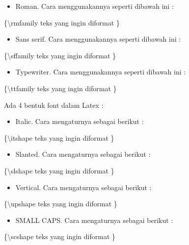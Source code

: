 \begin{itemize}
\item Roman. Cara menggunakannya seperti dibawah ini :
\end{itemize}
\hspace{0,5in}\{$\setminus$rmfamily teks yang ingin diformat \}

\begin{itemize}
\item Sans serif. Cara menggunakannya seperti dibawah ini :
\end{itemize}
\hspace{0,5in}\{$\setminus$sffamily teks yang ingin diformat \}

\begin{itemize}
\item Typewriter. Cara menggunakannya seperti dibawah ini :
\end{itemize}
\hspace{0,5in}\{$\setminus$ttfamily teks yang ingin diformat \}\par \vspace{12pt}



Ada 4 bentuk font dalam Latex :

\begin{itemize}
\item Italic. Cara mengaturnya sebagai berikut :
\end{itemize}
\hspace{0,5in}\{$\setminus$itshape teks yang ingin diformat \}

\begin{itemize}
\item Slanted. Cara mengaturnya sebagai berikut :
\end{itemize}
\hspace{0,5in}\{$\setminus$slshape teks yang ingin diformat \}

\begin{itemize}
\item Vertical. Cara mengaturnya sebagai berikut :
\end{itemize}
\hspace{0,5in}\{$\setminus$upshape teks yang ingin diformat \}

\begin{itemize}
\item SMALL CAPS. Cara mengaturnya sebagai berikut :
\end{itemize}
\hspace{0,5in}\{$\setminus$scshape teks yang ingin diformat \}
\par \vspace{12pt}



